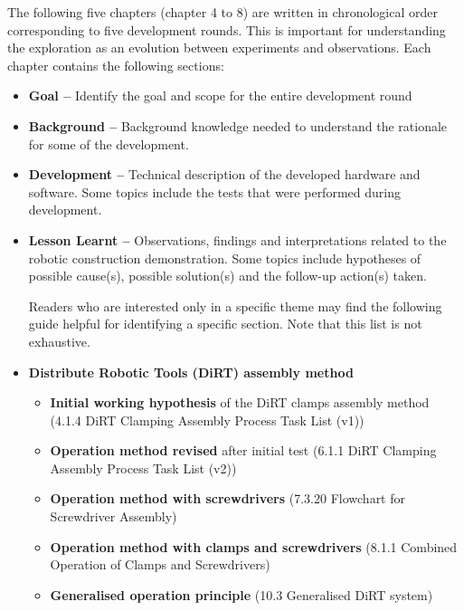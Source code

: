 The following five chapters (chapter 4 to 8) are written in chronological order corresponding to five development rounds. This is important for understanding the exploration as an evolution between experiments and observations.  Each chapter contains the following sections:

\begin{itemize}
	\item \textbf{Goal --} Identify the goal and scope for the entire development round

	\item \textbf{Background --} Background knowledge needed to understand the rationale for some of the development.

	\item \textbf{Development --} Technical description of the developed hardware and software. Some topics include the tests that were performed during development.

	\item \textbf{Lesson Learnt --} Observations, findings and interpretations related to the robotic construction demonstration. Some topics include hypotheses of possible cause(s), possible solution(s) and the follow-up action(s) taken. 

Readers who are interested only in a specific theme may find the following guide helpful for identifying a specific section. Note that this list is not exhaustive. 

	\item \textbf{Distribute Robotic Tools (DiRT) assembly method}

\begin{itemize}
	\item \textbf{Initial working hypothesis} of the DiRT clamps assembly method (4.1.4 DiRT Clamping Assembly Process Task List (v1))

	\item \textbf{Operation method revised} after initial test (6.1.1 DiRT Clamping Assembly Process Task List (v2))

	\item \textbf{Operation method with screwdrivers} (7.3.20 Flowchart for Screwdriver Assembly)

	\item \textbf{Operation method with clamps and screwdrivers }(8.1.1 Combined Operation of Clamps and Screwdrivers)

	\item \textbf{Generalised operation principle} (10.3 Generalised DiRT system)


\end{itemize}
\end{itemize}
